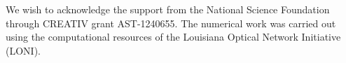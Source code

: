 \documentclass[a4paper,fleqn,usenatbib]{mnras}
\begin{document}
We wish to acknowledge the support from the National Science Foundation through CREATIV grant AST-1240655. The numerical work was carried out using the computational resources of the Louisiana Optical Network Initiative (LONI). 















\bsp	%
\label{lastpage}
\end{document}
